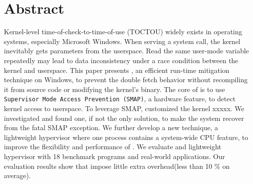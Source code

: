 \section{Abstract}


Kernel-level time-of-check-to-time-of-use (TOCTOU) widely exists in operating systems, especially Microsoft Windows. When serving a system call, the kernel inevitably gets parameters from the userspace. Read the same user-mode variable repeatedly may lead to data inconsistency under a race condition between the kernel and userspace. This paper presents \name, an efficient run-time mitigation technique on Windows, to prevent the double fetch behavior without recompiling it from source code or modifying the kernel's binary. The core of \name is to use \texttt{Supervisor Mode Access Prevention (SMAP)}, a hardware feature, to detect kernel access to userspace. To leverage SMAP, \name customized the kernel xxxxx. We investigated and found one, if not the only solution, to make the system recover from the fatal SMAP exception. 
We further develop a new technique, a lightweight hypervisor where one process contains a system-wide CPU feature, to improve the flexibility and performance of \name. We evaluate \name and lightweight hypervisor with 18 benchmark programs and real-world applications. Our evaluation results show that \name impose little extra overhead(less than 10 \% on average).
